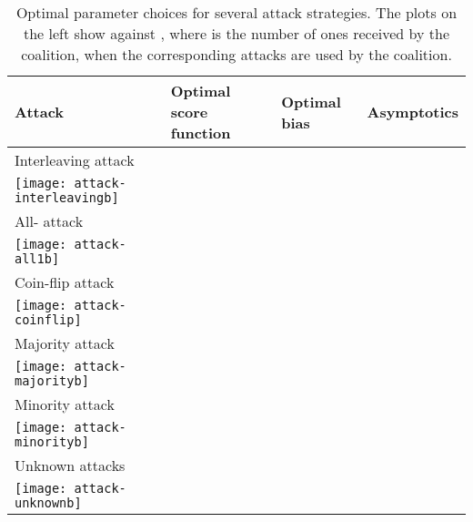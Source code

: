 \documentclass[10pt,a4paper,twocolumn]{article}
\begin{document}
\begin{table*}[t]
\centering

    \caption{Optimal parameter choices for several attack strategies. The plots on the left show  against , where  is the number of ones received by the coalition, when the corresponding attacks are used by the coalition.}
    \label{tab:1}
\renewcommand{\arraystretch}{1.3}\begin{small}
    \begin{tabular}{p{2.8cm}p{8.2cm}p{2.2cm}p{3cm}}
    \toprule
    {\bfseries Attack} & {\bfseries Optimal score function } & {\bfseries Optimal bias } & {\bfseries Asymptotics } \\ 
    \midrule
    Interleaving attack & \multirow{4}{*}{} & \multirow{2}{*}{}  & \multirow{2}{*}{} \\
    \multirow{3}{*}{\texttt{[image: attack-interleavingb]}}	& &	& \\
            & &	\multirow{2}{*}{} & \multirow{2}{*}{} \\
            & & & \\
    \midrule
	All- attack & \multirow{4}{*}{} & \multirow{2}{*}{} & \multirow{2}{*}{} \\
	\multirow{3}{*}{\texttt{[image: attack-all1b]}}			& & & \\
& & \multirow{2}{*}{} & \multirow{2}{*}{} \\
			& & & \\
\midrule
    Coin-flip attack &  & \multirow{2}{*}{} & \multirow{2}{*}{} \\
	\multirow{4}{*}{\texttt{[image: attack-coinflip]}}	& \multirow{4}{*}{} & & \\ & & \multirow{2}{*}{} & \multirow{2}{*}{} \\
		& & & \\
		& & & \\
    \midrule
    \hyphenation{voting}
    Majority attack & \multirow{4}{*}{} &	\multirow{2}{*}{} & \multirow{2}{*}{} \\
	\multirow{3}{*}{\texttt{[image: attack-majorityb]}} & & & \\
		& & & \\
		& & & \\
    \midrule
    Minority attack & \multirow{4}{*}{} &	\multirow{2}{*}{} & \multirow{2}{*}{} \\
	\multirow{3}{*}{\texttt{[image: attack-minorityb]}}		& & & \\ & & \multirow{2}{*}{} & \multirow{2}{*}{} \\
		& & & \\
\midrule
    Unknown attacks & \multirow{4}{*}{} &	\multirow{2}{*}{} & \multirow{2}{*}{} \\
	\multirow{3}{*}{\texttt{[image: attack-unknownb]}}	& & & \\ & & & \\
			& & & \\
    \bottomrule
    \end{tabular}
    \end{small}
\end{table*}
\end{document}
